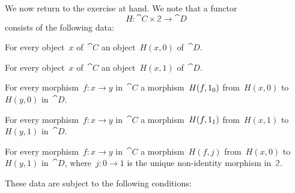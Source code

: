 We now return to the exercise at hand.
We note that a functor
\[
	H \colon \cat{C} × 𝟚 \to \cat{D}
\]
consists of the following data:
\begin{enumerate*}[label = D\arabic*., ref = D\arabic*]

	\item
		\label{data of H(x, 0)}
		For every object~$x$ of~$\cat{C}$ an object~$H(x, 0)$ of~$\cat{D}$.

	\item
		\label{data of H(x, 1)}
		For every object~$x$ of~$\cat{C}$ an object~$H(x, 1)$ of~$\cat{D}$.

	\item
		\label{data of H(f, id0)}
		For every morphism~$f \colon x \to y$ in~$\cat{C}$ a morphism~$H(f, 1_0)$ from~$H(x, 0)$ to~$H(y, 0)$ in~$\cat{D}$.

	\item
		\label{data of H(f, id1)}
		For every morphism~$f \colon x \to y$ in~$\cat{C}$ a morphism~$H(f, 1_1)$ from~$H(x, 1)$ to~$H(y, 1)$ in~$\cat{D}$.

	\item
		\label{data of H(f, j)}
		For every morphism~$f \colon x \to y$ in~$\cat{C}$ a morphism~$H(f, j)$ from~$H(x, 0)$ to~$H(y, 1)$ in~$\cat{D}$, where~$j \colon 0 \to 1$ is the unique non-identity morphism in~$𝟚$.

\end{enumerate*}
These data are subject to the following conditions:
